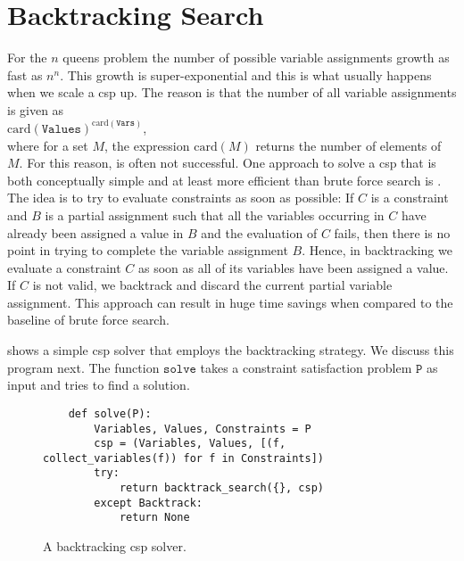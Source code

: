\section{Backtracking Search}
For the $n$ queens problem the number of possible variable assignments growth as fast as $n^n$.
This growth is super-exponential and this is what usually happens when we scale a \ac{csp} up. 
The reason is that the number of all variable assignments is given as
\\[0.2cm]
\hspace*{1.3cm}
$\mathrm{card}(\texttt{Values})^{\mathrm{card}(\texttt{Vars})}$,
\\[0.2cm]
where for a set $M$, the expression $\mathrm{card}(M)$ returns the number of elements of $M$.
For this reason,  is often not successful.  One approach to solve a \ac{csp} that is
both conceptually simple and at least more efficient than brute force search is .  The idea
is to try to evaluate constraints as soon as possible:  If $C$ is a constraint and $B$ is a partial assignment
such that all the variables occurring in $C$ have already been assigned a value in $B$ and the evaluation of $C$
fails, then there is no point in trying to complete the variable assignment $B$.  Hence, in backtracking we
evaluate a constraint $C$ as soon as all of its variables have been assigned a value.  If $C$ is not valid, we
backtrack and discard the current partial variable assignment.  This approach can result in huge time savings
when compared to the baseline of brute force search.

 shows a simple \ac{csp} solver 
that employs the backtracking strategy.  
We discuss this program next.  The function $\texttt{solve}$ takes a constraint
satisfaction problem $\texttt{P}$ as input and tries to find a solution.  


\begin{figure}[!ht]
\centering
\begin{verbatim}
    def solve(P):
        Variables, Values, Constraints = P
        csp = (Variables, Values, [(f, collect_variables(f)) for f in Constraints])
        try:
            return backtrack_search({}, csp)
        except Backtrack:
            return None
\end{verbatim}
\vspace*{-0.3cm}
\caption{A backtracking \ac{csp} solver.}
\label{fig:Backtrack-Solver.ipynb}
\end{figure}

